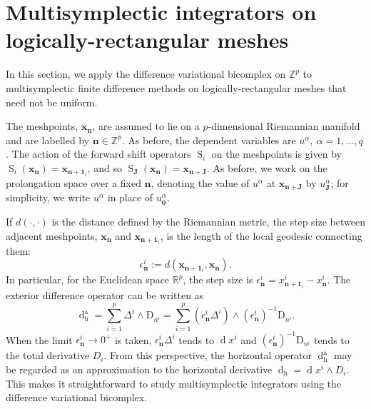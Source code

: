 \documentclass[11pt]{article} %
\numberwithin{equation}{section}
\newcommand{\es}{\operatorname{S}}
\newcommand{\upd}{\operatorname{d}}
\newcommand{\uph}{\operatorname{h}}
\newcommand{\diffi}{\mathrm{D}_{n^i}}
\newcommand{\mbn}{\mathbf{n}}
\newcommand{\mbx}{\mathbf{x}}
\newcommand{\mbJ}{\mathbf{J}}
\theoremstyle{plain}
\theoremstyle{definition}
\begin{document}
\section{Multisymplectic integrators on logically-rectangular meshes}
\label{sec:multisyin}
In this section, we apply the difference variational bicomplex
on $\mathbb{Z}^p$ to multisymplectic finite difference methods on logically-rectangular meshes that need not be uniform. 

The meshpoints, $\mbx_\mbn$, are assumed to lie on a $p$-dimensional Riemannian manifold and are labelled by $\mbn\in\mathbb{Z}^p$. As before, the dependent variables are $u^\alpha,\ \alpha=1,\dots,q$. The action of the forward shift operators $\es_i$ on the meshpoints is given by $\es_i(\mbx_\mbn)=\mbx_{\mbn+\mathbf{1}_i}$, and so $\es_\mbJ(\mbx_\mbn)=\mbx_{\mbn+\mbJ}$. As before, we work on the prolongation space over a fixed $\mbn$, denoting the value of $u^\alpha$ at $\mbx_{\mbn+\mbJ}$ by $u^\alpha_\mbJ$; for simplicity, we write $u^\alpha$ in place of $u^\alpha_{\mathbf{0}}$. 

If $d(\cdot,\cdot)$ is the distance defined by the Riemannian metric, the step size between adjacent meshpoints, $\mbx_\mbn$ and $\mbx_{\mbn+\mathbf{1}_i}$, is
the length of the local geodesic
connecting them:
\begin{equation}
\epsilon_\mbn^i:=d(\mbx_{\mbn+\mathbf{1}_i},\mbx_{\mbn}).
\end{equation}
In particular, for the Euclidean space
$\mathbb{R}^p$, the step size is $\epsilon_\mbn^i=x^i_{\mbn+\mathbf{1}_i}-x^i_\mbn$. The exterior difference operator can be written as
\begin{equation}
\upd_{\uph}^{\vartriangle}=\sum_{i=1}^p\Delta^i\wedge\diffi=\sum_{i=1}^p\left(\epsilon_\mbn^i\Delta^i\right)\wedge(\epsilon_\mbn^i)^{-1}\diffi.
\end{equation}
When the limit $\epsilon_\mbn^i\rightarrow 0^+$ is taken, $\epsilon_\mbn^i\Delta^i$ tends to
$\upd\!x^i$ and
$(\epsilon_\mbn^i)^{-1}\diffi$ tends to the total
derivative  $D_i$. From this perspective, the horizontal operator $\upd_{\uph}^{\vartriangle}$ may be regarded as an approximation to the horizontal derivative $\upd_{\uph}\!=\upd\!x^i\wedge
D_i$. This makes it straightforward to study multisymplectic integrators using the difference variational bicomplex.
\end{document}
